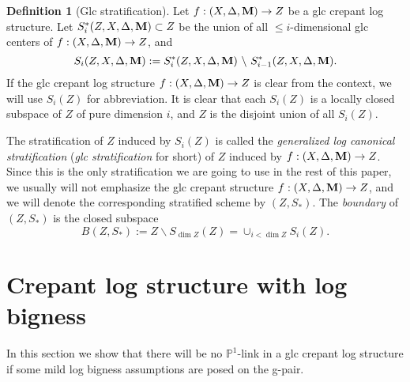 \documentclass[11pt]{amsart}
\numberwithin{equation}{section}
\newcommand{\Mm}{{\bf{M}}}
\newcommand{\Pp}{\mathbb{P}}
\theoremstyle{definition}
\newtheorem{defn}[thm]{Definition}
\theoremstyle{definition}
\theoremstyle{definition}
\begin{document}
\begin{defn}[Glc stratification]
Let $f:(X,\Delta,\Mm)\to Z$ be a glc crepant log structure. Let $S^*_i(Z,X,\Delta,\Mm)\subset Z$ be the union of all $\le i$-dimensional glc centers of $f:(X,\Delta,\Mm)\to Z$, and
$$
S_i(Z,X,\Delta,\Mm):=S^*_i(Z,X,\Delta,\Mm)~\backslash ~S^*_{i-1}(Z,X,\Delta,\Mm).
$$
If the glc crepant log structure $f:(X,\Delta,\Mm)\to Z$ is clear from the context, we will use $S_i(Z)$ for abbreviation. It is clear that each $S_i(Z)$ is a locally closed subspace of $Z$ of pure dimension $i$, and $Z$ is the disjoint union of all $S_i(Z)$. 

The stratification of $Z$ induced by $S_i(Z)$ is called the \emph{generalized log canonical stratification} (\emph{glc stratification} for short) of $Z$ induced by $f:(X,\Delta,\Mm)\to Z$.  Since this is the only stratification we are going to use in the rest of this paper, we usually will not emphasize the glc crepant structure $f:(X,\Delta,\Mm)\to Z$, and we will denote the corresponding stratified scheme by $(Z,S_*)$. The \emph{boundary} of $(Z,S_*)$ is the closed subspace
$$B(Z,S_*):=Z\backslash S_{\dim Z}(Z)=\cup_{i<\dim Z}S_i(Z).$$
\end{defn}


\begin{comment}

\begin{defn}\label{defn: of glc origin}
We say that a semi-normal stratified space $(Y,S_*)$ is \textit{of generalized log canonical (glc) origin} if 
\begin{enumerate}
    \item $S_i(Y)$ is unibranch for any $i$, and
    \item there are glc crepant log structures $f_j:(X_j,\Delta_j,\Mm^j)\to Z_j$ with glc stratifications $(Z_j,S_{*}^j)$ and a finite surjective stratified morphism $\pi: \amalg_j(Z_j,S_{*}^j)\to (Y,S_*)$.
\end{enumerate}

\end{defn}
\end{comment}




\section{Crepant log structure with log bigness}

In this section we show that there will be no $\Pp^1$-link in a glc crepant log structure if some mild log bigness assumptions are posed on the g-pair.
\end{document}
